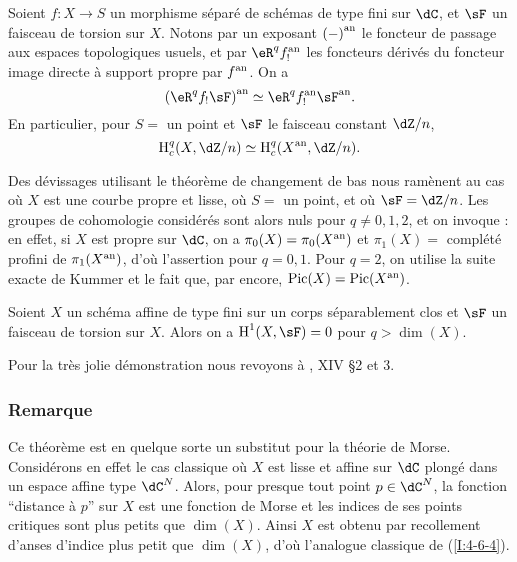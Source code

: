 \begin{theorem}\label{I:4-6-3}
Soient $f:X\to S$ un morphisme séparé de schémas de type fini sur $\dC$, 
et $\sF$ un faisceau de torsion sur $X$. Notons par un exposant ${(-)}^{\textnormal{an}}$ le 
foncteur de passage aux espaces topologiques usuels, et par $\eR^q \an f_!$ les 
foncteurs dérivés du foncteur image directe à support propre par ${f}^{\textnormal{an}}$. On a 
\[
  \an{(\eR^q f_! \sF)} \simeq \eR^q \an f_! \an \sF \text{.}
\]
En particulier, pour $S=$ un point et $\sF$ le faisceau constant $\dZ/n$, 
\[
  \h_c^q(X,\dZ/n) \simeq \h_c^q(\an X,\dZ/n)\text{.}
\]
\end{theorem}

Des dévissages utilisant le théorème de changement de bas nous ramènent au 
cas où $X$ est une courbe propre et lisse, où $S=$ un point, et où 
$\sF=\dZ/n$. Les groupes de cohomologie considérés sont alors nuls pour 
$q\ne 0,1,2$, et on invoque \cite{se55}: en effet, si $X$ est propre sur $\dC$, 
on a $\pi_0(X) = \pi_0({X}^{\textnormal{an}})$ et $\pi_1(X) = $ complété profini de 
$\pi_1({X}^{\textnormal{an}})$, d'où l'assertion pour $q=0,1$. Pour $q=2$, on utilise la 
suite exacte de Kummer et le fait que, par \cite{se55} encore, 
$\operatorname{Pic}(X)=\operatorname{Pic}({X}^{\textnormal{an}})$. 





\begin{theorem}\label{I:4-6-4}
Soient $X$ un schéma affine de type fini sur un corps séparablement clos et 
$\sF$ un faisceau de torsion sur $X$. Alors on a $\h^1(X,\sF) = 0$ pour 
$q>\dim(X)$. 
\end{theorem}

Pour la très jolie démonstration nous revoyons à \cite{sga4}, XIV \S 2 et 3. 





\subsubsection{Remarque}\label{I:4-6-5}

Ce théorème est en quelque sorte un substitut pour la théorie de Morse. 
Considérons en effet le cas classique où $X$ est lisse et affine sur $\dC$ 
plongé dans un espace affine type $\dC^N$. Alors, pour presque tout point 
$p\in\dC^N$, la fonction ``distance à $p$'' sur $X$ est une fonction de Morse 
et les indices de ses points critiques sont plus petits que $\dim(X)$. Ainsi 
$X$ est obtenu par recollement d'anses d'indice plus petit que $\dim(X)$, d'où 
l'analogue classique de (\ref{I:4-6-4}). 




















